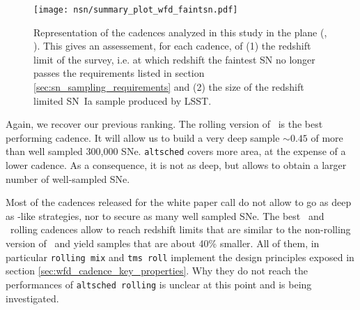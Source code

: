 \begin{sidewaysfigure}
  \begin{center}
    \texttt{[image: nsn/summary\_plot\_wfd\_faintsn.pdf]}
    \caption{Representation of the cadences analyzed in this study in
      the plane (\zfaint, \nsnfaint). This gives an assessement, for
      each cadence, of (1) the redshift limit of the survey, i.e. at
      which redshift the faintest SN no longer passes the requirements
      listed in section \ref{sec:sn_sampling_requirements} and (2) the
      size of the redshift limited SN~Ia sample produced by LSST.}
    \label{fig:nsn_zmax_faint}
  \end{center}
\end{sidewaysfigure}

Again, we recover our previous ranking.  The rolling version of
\altsched~is the best performing cadence.  It will allow us to build a
very deep sample \zmed $\sim 0.45$ of more than well sampled 300,000
SNe.  {\tt altsched} covers more area, at the expense of a lower
cadence.  As a consequence, it is not as deep, but allows to obtain a
larger number of well-sampled SNe.

 Most of the cadences released for the white paper call do not allow to
go as deep as \altschednosp-like strategies, nor to secure as many well sampled SNe. The best \opsim~and
\slair~rolling cadences allow to reach redshift limits that are
similar to the non-rolling version of \altsched~and yield samples that
are about 40\% smaller. All of them, in particular {\tt rolling mix}
and {\tt tms roll} implement the design principles exposed in section
\ref{sec:wfd_cadence_key_properties}. Why they do not reach the
performances of {\tt altsched rolling} is unclear at this point and is
being investigated.
